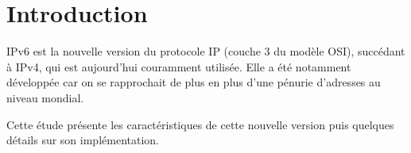   \section{Introduction}
  IPv6 est la nouvelle version du protocole IP (couche 3 du modèle OSI), succédant à IPv4, qui est aujourd'hui couramment utilisée. Elle a été notamment développée car on se rapprochait de plus en plus d’une pénurie d’adresses au niveau mondial.
  
  Cette étude présente les caractéristiques de cette nouvelle version puis quelques détails sur son implémentation.
  
